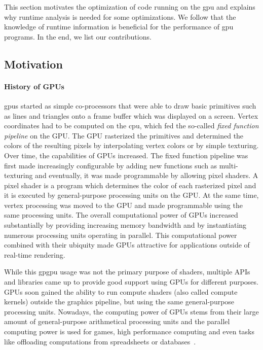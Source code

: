 {}
This section motivates the optimization of code running on the \gls{gpu} and explains why runtime analysis is needed for some optimizations.
We follow that the knowledge of runtime information is beneficial for the performance of \gls{gpu} programs. In the end, we list our contributions.

\subsection{Motivation}
\label{sub:motivation}
\paragraph{History of GPUs} \Glspl{gpu} started as simple co-processors that were able to draw basic primitives such as lines and triangles onto a frame buffer which was displayed on a screen.
Vertex coordinates had to be computed on the \gls{cpu}, which fed the so-called \emph{fixed function pipeline} on the GPU.
The GPU rasterized the primitives and determined the colors of the resulting pixels by interpolating vertex colors or by simple texturing.
Over time, the capabilities of GPUs increased. The fixed function pipeline was first made increasingly configurable by adding new functions such as multi-texturing and eventually, it was made programmable by allowing pixel shaders.
A pixel shader is a program which determines the color of each rasterized pixel and it is executed by general-purpose processing units on the GPU.
At the same time, vertex processing was moved to the GPU and made programmable using the same processing units.
The overall computational power of GPUs increased substantially by providing increasing memory bandwidth and by instantiating numerous processing units operating in parallel.
This computational power combined with their ubiquity made GPUs attractive for applications outside of real-time rendering.~\cite{McClanahan2010}

While this \gls{gpgpu} usage was not the primary purpose of shaders, multiple APIs and libraries came up to provide good support using GPUs for different purposes.
GPUs soon gained the ability to run compute shaders (also called compute kernels) outside the graphics pipeline, but using the same general-purpose processing units.
Nowadays, the computing power of GPUs stems from their large amount of general-purpose arithmetical processing units and the parallel computing power is used for games, high performance computing and even tasks like offloading computations from spreadsheets or databases~\cite{Lillqvist2016, Meraji2015}.

